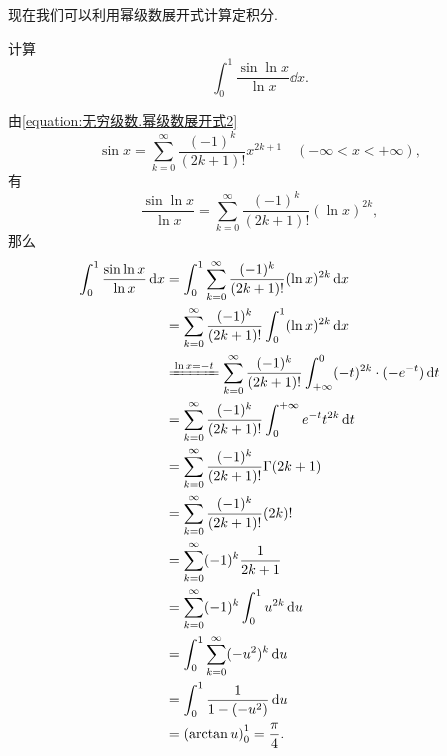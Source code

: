 现在我们可以利用幂级数展开式计算定积分.
\begin{example}
计算\[
\int_0^1 \frac{\sin\ln x}{\ln x} \dd{x}.
\]
\begin{solution}
由\cref{equation:无穷级数.幂级数展开式2} \[
\sin x = \sum\limits_{k=0}^{\infty} \frac{(-1)^k}{(2k+1)!} x^{2k+1}
	\quad (-\infty<x<+\infty),
\]有\[
\frac{\sin\ln x}{\ln x} = \sum\limits_{k=0}^{\infty} \frac{(-1)^k}{(2k+1)!} (\ln x)^{2k},
\]那么\begin{align*}
\int_0^1 \frac{\sin\ln x}{\ln x} \dd{x}
&= \int_0^1 \sum\limits_{k=0}^{\infty} \frac{(-1)^k}{(2k+1)!} (\ln x)^{2k} \dd{x} \\
&= \sum\limits_{k=0}^{\infty} \frac{(-1)^k}{(2k+1)!} \int_0^1 (\ln x)^{2k} \dd{x} \\
&\xlongequal{\ln x = -t}
	\sum\limits_{k=0}^{\infty} \frac{(-1)^k}{(2k+1)!}
	\int_{+\infty}^0 (-t)^{2k} \cdot (-e^{-t}) \dd{t} \\
&= \sum\limits_{k=0}^{\infty} \frac{(-1)^k}{(2k+1)!}
	\int^{+\infty}_0 e^{-t} t^{2k} \dd{t} \\
&= \sum\limits_{k=0}^{\infty} \frac{(-1)^k}{(2k+1)!} \Gamma(2k+1) \\
&= \sum\limits_{k=0}^{\infty} \frac{(-1)^k}{(2k+1)!} (2k)! \\
&= \sum\limits_{k=0}^{\infty} (-1)^k \frac{1}{2k+1} \\
&= \sum\limits_{k=0}^{\infty} (-1)^k \int_0^1 u^{2k} \dd{u} \\
&= \int_0^1 \sum\limits_{k=0}^{\infty} (-u^2)^k \dd{u} \\
&= \int_0^1 \frac{1}{1-(-u^2)} \dd{u} \\
&= \left(\arctan u\right)_0^1
= \frac{\pi}{4}.
\end{align*}
\end{solution}
\end{example}

